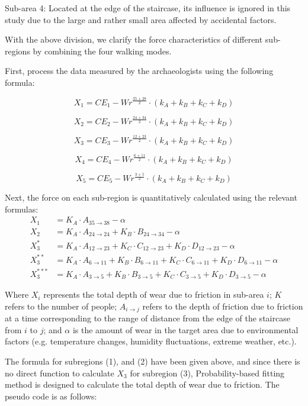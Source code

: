 \documentclass{mcmthesis}
\begin{document}
Sub-area 4: Located at the edge of the staircase, its influence is ignored in this study due to the large and rather small area affected by accidental factors.

With the above division, we clarify the force characteristics of different sub-regions by combining the four walking modes.

First, process the data measured by the archaeologists using the following formula:

\[ X_1 = CE_1 - Wr^{\frac{35 + 28}{2}} \cdot \left(k_A + k_B + k_C + k_D\right) \]

\[ X_2 = CE_2 - Wr^{\frac{24 + 34}{2}} \cdot \left(k_A + k_B + k_C + k_D\right) \]

\[ X_3 = CE_3 - Wr^{\frac{12 + 23}{2}} \cdot \left(k_A + k_B + k_C + k_D\right) \]

\[ X_4 = CE_4 - Wr^{\frac{6 + 11}{2}} \cdot \left(k_A + k_B + k_C + k_D\right) \]

\[ X_5 = CE_5 - Wr^{\frac{3 + 5}{2}} \cdot \left(k_A + k_B + k_C + k_D\right) \]

 Next, the force on each sub-region is quantitatively calculated using the relevant formulas:
 \begin{align}
  X_1 &= K_A \cdot A_{35 \to 38} - \alpha \\
  X_2 &= K_A \cdot A_{24 \to 24} + K_B \cdot B_{24 \to 34} - \alpha \\
  X_3^* &= K_A \cdot A_{12 \to 23} + K_C \cdot C_{12 \to 23} + K_D \cdot D_{12 \to 23} - \alpha \\
  X_3^{**} &= K_A \cdot A_{6 \to 11} + K_B \cdot B_{6 \to 11} + K_C \cdot C_{6 \to 11} + K_D \cdot D_{6 \to 11} - \alpha \\
  X_3^{***} &= K_A \cdot A_{3 \to 5} + K_B \cdot B_{3 \to 5} + K_C \cdot C_{3 \to 5} + K_D \cdot D_{3 \to 5} - \alpha
  \end{align}
  

Where $X_i$ represents the total depth of wear due to friction in sub-area $i$; $K$ refers to the number of people; $A_{i \to j}$ refers to the depth of friction due to friction at a time corresponding to the range of distance from the edge of the staircase from $i$ to $j$; and $\alpha$ is the amount of wear in the target area due to environmental factors (e.g. temperature changes, humidity fluctuations, extreme weather, etc.).

The formula for subregions (1), and (2) have been given above, and since there is no direct function to calculate $X_3$ for subregion (3), Probability-based fitting method is designed to calculate the total depth of wear due to friction. The pseudo code is as follows:
\end{document}
